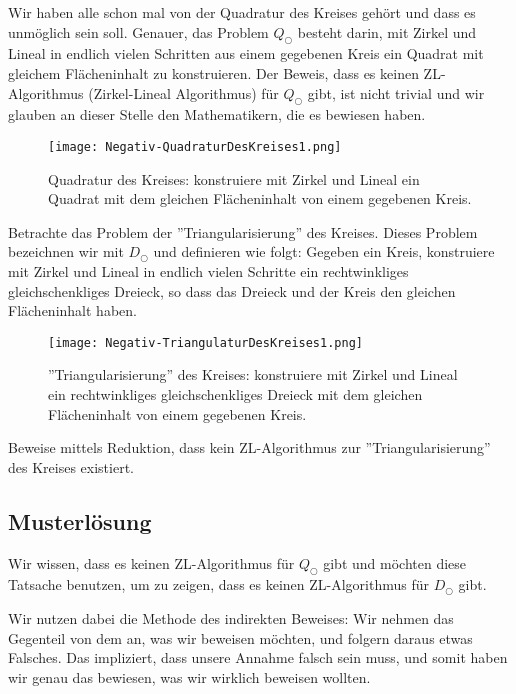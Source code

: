 \documentclass[
	12pt, %
	german, %
]{fphw}
\begin{document}
\begin{problem}
Wir haben alle schon mal von der Quadratur des Kreises gehört und dass es unmöglich sein soll. Genauer, das Problem \(Q_{\bigcirc}\) besteht darin, mit Zirkel und Lineal in endlich vielen Schritten aus einem gegebenen Kreis ein Quadrat mit gleichem Flächeninhalt zu konstruieren. Der Beweis, dass es keinen ZL-Algorithmus (Zirkel-Lineal Algorithmus) für \(Q_{\bigcirc}\) gibt, ist nicht trivial und wir glauben an dieser Stelle den Mathematikern, die es bewiesen haben.

\begin{figure}[H]
	\centering
	\texttt{[image: Negativ-QuadraturDesKreises1.png]}
	\caption{Quadratur des Kreises: konstruiere mit Zirkel und Lineal ein Quadrat mit dem gleichen Flächeninhalt von einem gegebenen Kreis.}
\end{figure}

Betrachte das Problem der ''Triangularisierung'' des Kreises. Dieses Problem bezeichnen wir mit \(D_{\bigcirc}\) und definieren wie folgt: Gegeben ein Kreis, konstruiere mit Zirkel und Lineal in endlich vielen Schritte ein rechtwinkliges gleichschenkliges Dreieck, so dass das Dreieck und der Kreis den gleichen Flächeninhalt haben.
\begin{figure}[H]
	\centering
	\texttt{[image: Negativ-TriangulaturDesKreises1.png]}
	\caption{''Triangularisierung'' des Kreises: konstruiere mit Zirkel und Lineal ein rechtwinkliges gleichschenkliges Dreieck mit dem gleichen Flächeninhalt von einem gegebenen Kreis.}
\end{figure}
Beweise mittels Reduktion, dass kein ZL-Algorithmus zur ''Triangularisierung'' des Kreises existiert.
\end{problem}


\subsection*{Musterlösung}

Wir wissen, dass es keinen ZL-Algorithmus für \(Q_{\bigcirc}\) gibt und möchten diese Tatsache benutzen, um zu zeigen, dass es keinen ZL-Algorithmus für \(D_{\bigcirc}\) gibt.

Wir nutzen dabei die Methode des indirekten Beweises: Wir nehmen das Gegenteil von dem an, was wir beweisen möchten, und folgern daraus etwas Falsches. Das impliziert, dass unsere Annahme falsch sein muss, und somit haben wir genau das bewiesen, was wir wirklich beweisen wollten.
\end{document}
